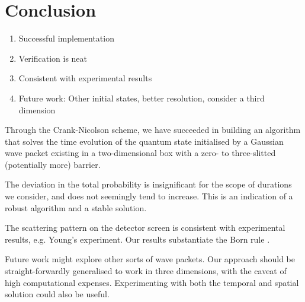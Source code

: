 \section{Conclusion}\label{sec:conclusion}

\begin{enumerate}
    \item Successful implementation
    \item Verification is neat
    \item Consistent with experimental results
    \item Future work: Other initial states, better resolution, consider a third dimension
\end{enumerate}


Through the Crank-Nicolson scheme, we have succeeded in building an algorithm that solves the time evolution of the quantum state initialised by a Gaussian wave packet existing in a two-dimensional box with a zero- to three-slitted (potentially more) barrier.

The deviation in the total probability is insignificant for the scope of durations we consider, and does not seemingly tend to increase. This is an indication of a robust algorithm and a stable solution.

The scattering pattern on the detector screen is consistent with experimental results, e.g. Young's experiment. Our results substantiate the Born rule .

Future work might explore other sorts of wave packets. Our approach should be straight-forwardly generalised to work in three dimensions, with the caveat of high computational expenses. Experimenting with both the temporal and spatial solution could also be useful.




